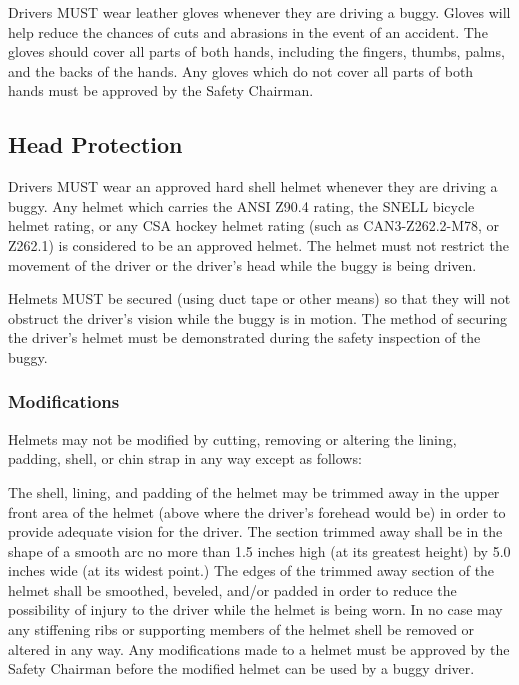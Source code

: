 	Drivers MUST wear leather gloves whenever they are driving a buggy. Gloves will
	help reduce the chances of cuts and abrasions in the event of an accident. The
	gloves should cover all parts of both hands, including the fingers, thumbs,
	palms, and the backs of the hands. Any gloves which do not cover all parts of
	both hands must be approved by the Safety Chairman.

\subsection{Head Protection}

	Drivers MUST wear an approved hard shell helmet whenever they are driving a
	buggy. Any helmet which carries the ANSI Z90.4 rating, the SNELL bicycle helmet
	rating, or any CSA hockey helmet rating (such as CAN3-Z262.2-M78, or Z262.1) is
	considered to be an approved helmet. The helmet must not restrict the movement
	of the driver or the driver's head while the buggy is being driven.

	Helmets MUST be secured (using duct tape or other means) so that they will not
	obstruct the driver's vision while the buggy is in motion. The method of
	securing the driver's helmet must be demonstrated during the safety inspection
	of the buggy.

\subsubsection{Modifications}
	
	Helmets may not be modified by cutting, removing or altering the lining,
	padding, shell, or chin strap in any way except as follows:
	\newline

	The shell, lining, and padding of the helmet may be trimmed away in the upper
	front area of the helmet (above where the driver's forehead would be) in order
	to provide adequate vision for the driver. The section trimmed away shall be in
	the shape of a smooth arc no more than 1.5 inches high (at its greatest height)
	by 5.0 inches wide (at its widest point.) The edges of the trimmed away section
	of the helmet shall be smoothed, beveled, and/or padded in order to reduce the
	possibility of injury to the driver while the helmet is being worn. In no case
	may any stiffening ribs or supporting members of the helmet shell be removed or
	altered in any way. Any modifications made to a helmet must be approved by the
	Safety Chairman before the modified helmet can be used by a buggy driver.

